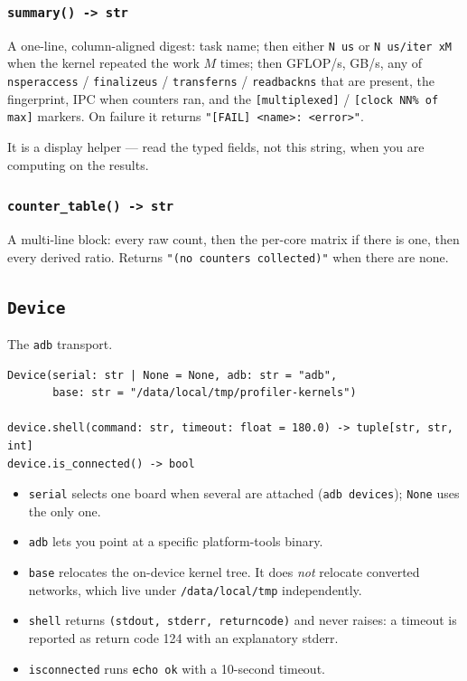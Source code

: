 \documentclass[11pt,a4paper]{article}
\newcommand{\code}[1]{\texttt{\let\_\breakableunderscore #1}}
\newcommand{\breakableunderscore}{\textunderscore\allowbreak}
\newcommand{\apient}[1]{\subsection{\texttt{#1}}}
\begin{document}
\subsubsection*{\texttt{summary() -> str}}

A one-line, column-aligned digest: task name; then either \code{N us} or
\code{N us/iter xM} when the kernel repeated the work $M$ times; then GFLOP/s,
GB/s, any of \code{ns\_per\_access} / \code{finalize\_us} / \code{transfer\_ns}
/ \code{readback\_ns} that are present, the fingerprint, IPC when counters ran,
and the \code{[multiplexed]} / \code{[clock NN\% of max]} markers. On failure it
returns \code{"[FAIL] <name>: <error>"}.

It is a display helper --- read the typed fields, not this string, when you are
computing on the results.

\subsubsection*{\texttt{counter\_table() -> str}}

A multi-line block: every raw count, then the per-core matrix if there is one,
then every derived ratio. Returns \code{"(no counters collected)"} when there
are none.

\apient{Device}

The \code{adb} transport.

\begin{lstlisting}
Device(serial: str | None = None, adb: str = "adb",
       base: str = "/data/local/tmp/profiler-kernels")

device.shell(command: str, timeout: float = 180.0) -> tuple[str, str, int]
device.is_connected() -> bool
\end{lstlisting}

\begin{itemize}[leftmargin=0.6cm]
  \item \code{serial} selects one board when several are attached
    (\code{adb devices}); \code{None} uses the only one.
  \item \code{adb} lets you point at a specific platform-tools binary.
  \item \code{base} relocates the on-device kernel tree. It does \emph{not}
    relocate converted networks, which live under \code{/data/local/tmp}
    independently.
  \item \code{shell} returns \code{(stdout, stderr, returncode)} and never
    raises: a timeout is reported as return code 124 with an explanatory
    stderr.
  \item \code{is\_connected} runs \code{echo ok} with a 10-second timeout.
\end{itemize}
\end{document}
